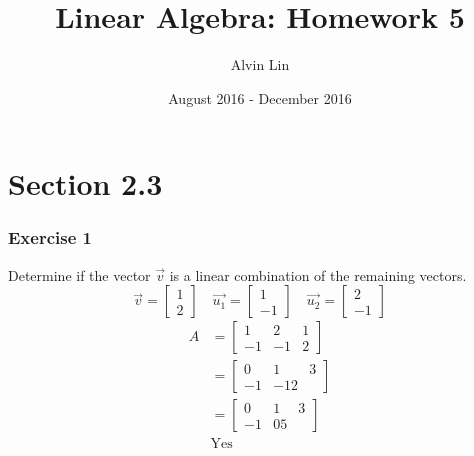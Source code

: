 \documentclass{math}
\title{Linear Algebra: Homework 5}
\author{Alvin Lin}
\date{August 2016 - December 2016}
\begin{document}
\maketitle

\section*{Section 2.3}

\subsubsection*{Exercise 1}
Determine if the vector \( \vec{v} \) is a linear combination of the remaining
vectors.
\[ \vec{v} = \begin{bmatrix}1 \\ 2\end{bmatrix} \quad
  \vec{u_1} = \begin{bmatrix}1 \\ -1\end{bmatrix} \quad
  \vec{u_2} = \begin{bmatrix}2 \\ -1\end{bmatrix} \]
\begin{align*}
  A &= \begin{bmatrix}
    1 & 2 & 1 \\
    -1 & -1 & 2
  \end{bmatrix} \\
  &= \begin{bmatrix}
    0 & 1 & 3 \\
    -1 & -1 2
  \end{bmatrix} \\
  &= \begin{bmatrix}
    0 & 1 & 3 \\
    -1 & 0 5
  \end{bmatrix} \\
  & \text{Yes}
\end{align*}
\end{document}
